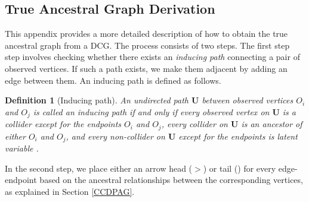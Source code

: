 \documentclass[twoside, 11pt]{article}
\newtheorem{definition}{Definition}
\begin{document}
\begin{appendices}


\section{True Ancestral Graph Derivation}\label{trueancestral}
This appendix provides a more detailed description of how to obtain the true ancestral graph from a DCG. The process consists of two steps. The first step step involves checking whether there exists an \textit{inducing path} connecting a pair of observed vertices. If such a path exists,  we make them adjacent by adding an edge between them. An inducing path is defined as follows.

\begin{definition} [Inducing path] \label{def: def1}
An undirected path $\mathbf{U}$ between observed vertices $O_i$ and $O_j$ is called an inducing path if and only if every observed vertex on $\mathbf{U}$ is a collider except for the endpoints $O_i$ and $O_j$, every collider on $\mathbf{U}$ is an ancestor of either $O_i$ and $O_j$, and every non-collider on $\mathbf{U}$ except for the endpoints is latent variable .
\end{definition}

\noindent In the second step, we place either an arrow head ($>$) or tail (\textendash) for every edge-endpoint based on the ancestral relationships between the corresponding vertices, as explained in Section \ref{CCDPAG}.


\end{appendices}
\end{document}
